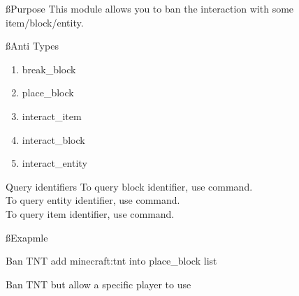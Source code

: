 
\ss{Purpose}
This module allows you to ban the interaction with some item/block/entity.

\ss{Anti Types}
\begin{enumerate}
    \item break\_block
    \item place\_block
    \item interact\_item
    \item interact\_block
    \item interact\_entity
\end{enumerate}

\begin{tips}{Query identifiers}
    To query block identifier, use  command.\\
    To query entity identifier, use  command.\\
    To query item identifier, use  command.
\end{tips}

\ss{Exapmle}
\begin{example}{Ban TNT}
    add minecraft:tnt into place\_block list
\end{example}

\begin{example}{Ban TNT but allow a specific player to use}
\end{example}


